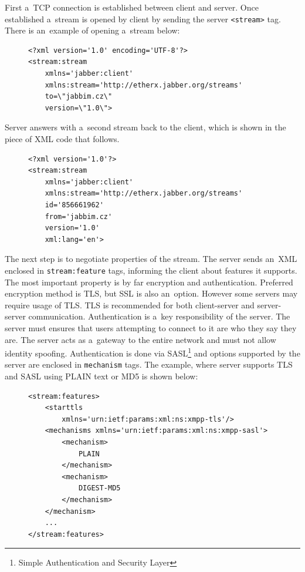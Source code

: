 First a~TCP connection is established between client and server. Once established a~stream is opened by client by sending the server \verb|<stream>| tag. There is an~example of opening a~stream below: 

\begin{figure}[h]
\begin{lstlisting}
<?xml version='1.0' encoding='UTF-8'?>
<stream:stream 
	xmlns='jabber:client' 
	xmlns:stream='http://etherx.jabber.org/streams' 
	to=\"jabbim.cz\" 
	version=\"1.0\">
\end{lstlisting}
\end{figure}

Server answers with a~second stream back to the client, which is shown in the piece of XML code that follows. 

\begin{figure}[h]
\begin{lstlisting}
<?xml version='1.0'?>
<stream:stream 
	xmlns='jabber:client' 
	xmlns:stream='http://etherx.jabber.org/streams' 
	id='856661962' 
	from='jabbim.cz' 
	version='1.0' 
	xml:lang='en'>
\end{lstlisting}
\end{figure}

The next step is to negotiate properties of the stream. The server sends an~XML enclosed in \verb|stream:feature| tags, informing the client about features it supports. The most important property is by far encryption and authentication. Preferred encryption method is TLS, but SSL is also an~option. However some servers may require usage of TLS. TLS is recommended for both client-server and server-server communication. Authentication is a~key responsibility of the server. The server must ensures that users attempting to connect to it are who they say they are. The server acts as a~gateway to the entire network and must not allow identity spoofing. Authentication is done via SASL\footnote{Simple Authentication and Security Layer} and options supported by the server are enclosed in \verb|mechanism| tags. The example, where server supports TLS and SASL using PLAIN text or MD5 is shown below:   

\begin{figure}[h]
\begin{lstlisting}
<stream:features>
	<starttls 
		xmlns='urn:ietf:params:xml:ns:xmpp-tls'/>
	<mechanisms xmlns='urn:ietf:params:xml:ns:xmpp-sasl'>
		<mechanism>
			PLAIN
		</mechanism>
		<mechanism>
			DIGEST-MD5
		</mechanism>
	</mechanism>
	...
</stream:features>
\end{lstlisting}
\end{figure}


